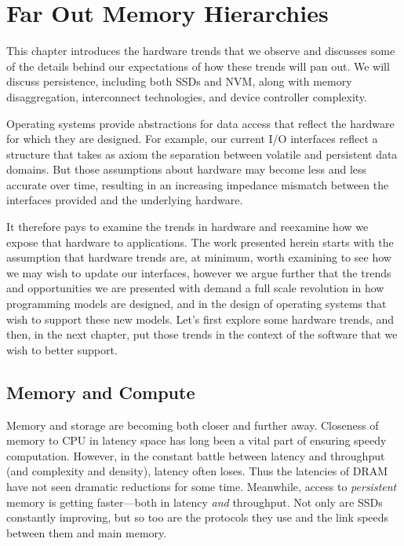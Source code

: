 \chapter{Far Out Memory Hierarchies}\label{ch:farout}

\begin{chabstract}
    This chapter introduces the hardware trends that we observe and discusses some of the details behind our expectations of how these trends will pan out. We will discuss persistence,
    including both SSDs and NVM, along with memory disaggregation, interconnect technologies, and device controller complexity.
\end{chabstract}

Operating systems provide abstractions for data access that reflect the hardware for which they are designed. For example, our current I/O interfaces reflect a structure that takes as axiom
the separation between volatile and persistent data domains. But those assumptions about hardware may become less and less accurate over time, resulting in an increasing impedance mismatch
between the interfaces provided and the underlying hardware.

It therefore pays to examine the trends in hardware and reexamine how we expose that hardware to applications. The work presented
herein starts with the assumption that hardware trends are, at minimum, worth examining to see how we may wish to update our interfaces, however we argue further that the trends and
opportunities we are presented with demand a full scale revolution in how programming models are designed, and in the design of operating systems that wish to support these new models. Let's
first explore some hardware trends, and then, in the next chapter, put those trends in the context of the software that we wish to better support.


\section{Memory and Compute}

Memory and storage are becoming both closer and further away. Closeness of memory to CPU in latency space has long been a vital part of ensuring speedy
computation. However, in the constant battle between latency and throughput (and complexity and density), latency often loses. Thus the latencies of DRAM have not seen dramatic reductions
for some time. Meanwhile, access to \emph{persistent} memory is getting faster---both in latency \emph{and} throughput. Not only are SSDs constantly improving, but so too are the protocols
they use and the link speeds between them and main memory.

